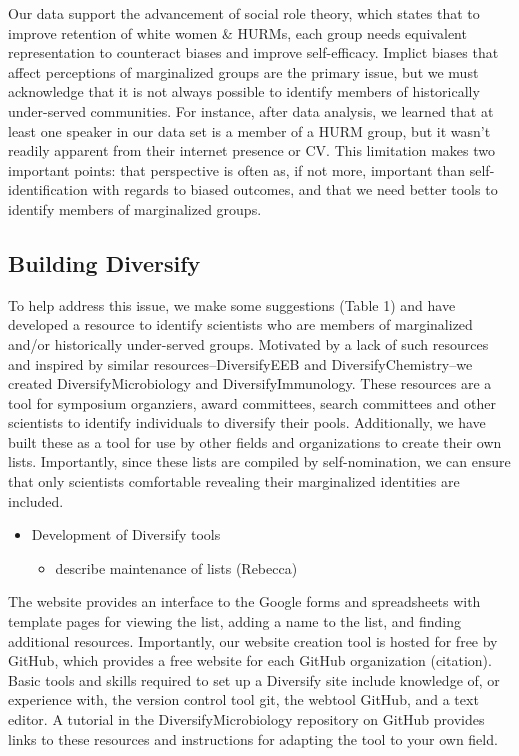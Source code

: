 \documentclass[10pt,]{article}
\providecommand{\tightlist}{%
  \setlength{\itemsep}{0pt}\setlength{\parskip}{0pt}}
\begin{document}
Our data support the advancement of social role theory, which states
that to improve retention of white women \& HURMs, each group needs
equivalent representation to counteract biases and improve
self-efficacy. Implict biases that affect perceptions of marginalized
groups are the primary issue, but we must acknowledge that it is not
always possible to identify members of historically under-served
communities. For instance, after data analysis, we learned that at least
one speaker in our data set is a member of a HURM group, but it wasn't
readily apparent from their internet presence or CV. This limitation
makes two important points: that perspective is often as, if not more,
important than self-identification with regards to biased outcomes, and
that we need better tools to identify members of marginalized groups.

\subsection{Building Diversify}\label{building-diversify}

To help address this issue, we make some suggestions (Table 1) and have
developed a resource to identify scientists who are members of
marginalized and/or historically under-served groups. Motivated by a
lack of such resources and inspired by similar resources--DiversifyEEB
and DiversifyChemistry--we created DiversifyMicrobiology and
DiversifyImmunology. These resources are a tool for symposium
organziers, award committees, search committees and other scientists to
identify individuals to diversify their pools. Additionally, we have
built these as a tool for use by other fields and organizations to
create their own lists. Importantly, since these lists are compiled by
self-nomination, we can ensure that only scientists comfortable
revealing their marginalized identities are included.

\begin{itemize}
\tightlist
\item
  Development of Diversify tools

  \begin{itemize}
  \tightlist
  \item
    describe maintenance of lists (Rebecca)
  \end{itemize}
\end{itemize}

The website provides an interface to the Google forms and spreadsheets
with template pages for viewing the list, adding a name to the list, and
finding additional resources. Importantly, our website creation tool is
hosted for free by GitHub, which provides a free website for each GitHub
organization (citation). Basic tools and skills required to set up a
Diversify site include knowledge of, or experience with, the version
control tool git, the webtool GitHub, and a text editor. A tutorial in
the DiversifyMicrobiology repository on GitHub provides links to these
resources and instructions for adapting the tool to your own field.
\end{document}
